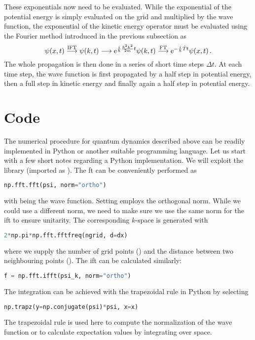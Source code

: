 These exponentials now need to be evaluated. While the exponential of the potential energy is simply evaluated on the grid and multiplied by the wave function, the exponential of the kinetic energy operator must be evaluated using the Fourier method introduced in the previous subsection as
\begin{equation}
    \psi(x,t) \stackrel{\mathrm{IFT}}{\longrightarrow} \psi(k,t) \longrightarrow \mathrm{e}^{\frac{i}{\hbar} \frac{\hbar^2 k^2}{2m} t} \psi(k,t) \stackrel{\mathrm{FT}}{\longrightarrow} \mathrm{e}^{-\frac{i}{\hbar} \hat{T} t}\psi(x,t) \, .
\end{equation}
The whole propagation is then done in a series of short time steps $\Delta t$. At each time step, the wave function is first propagated by a half step in potential energy, then a full step in kinetic energy and finally again a half step in potential energy. 

\section{Code}

The numerical procedure for quantum dynamics described above can be readily implemented in Python or another suitable programming language. Let us start with a few short notes regarding a Python implementation. We will exploit the  library (imported as ). The \acrlong{ft} can be conveniently performed as
\begin{lstlisting}[language=Python, style=mystyle2]
np.fft.fft(psi, norm="ortho")
\end{lstlisting}
with  being the wave function. Setting  employs the orthogonal norm. While we could use a different norm, we need to make sure we use the same norm for the \acrshort{ift} to ensure unitarity. The corresponding $k$-space is generated with
\begin{lstlisting}[language=Python, style=mystyle2]
2*np.pi*np.fft.fftfreq(ngrid, d=dx)
\end{lstlisting}
where we supply the number of grid points () and the distance between two neighbouring points (). The \acrlong{ift} can be calculated similarly: 
\begin{lstlisting}[language=Python, style=mystyle2]
f = np.fft.ifft(psi_k, norm="ortho")
\end{lstlisting}

The integration can be achieved with the trapezoidal rule in Python by selecting
\begin{lstlisting}[language=Python, style=mystyle2]
np.trapz(y=np.conjugate(psi)*psi, x=x)
\end{lstlisting}
The trapezoidal rule is used here to compute the normalization of the wave function or to calculate expectation values by integrating over space.

